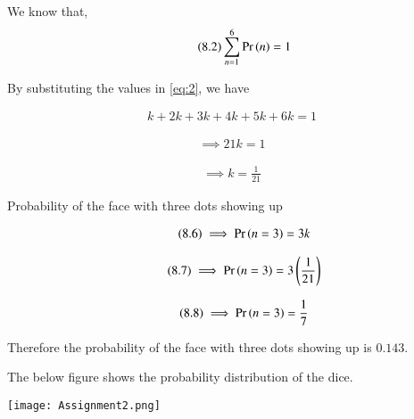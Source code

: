 \documentclass[journal,12pt,twocolumn]{IEEEtran}
\begin{document}
\vspace{\baselineskip}

We know that,
\begin{align}
    \tag{8.2}
    \sum_{n=1}^6\Pr\left(n\right)=1
    \label{eq:2}
\end{align}

By substituting the values in \ref{eq:2}, we have

\begin{align}
    \tag{8.3}
    k+2k+3k+4k+5k+6k=1
    \label{eq:3}
\end{align}

\begin{align}
     \tag{8.4}
   \implies  21k=1
    \label{eq:4}
\end{align}

\begin{align}
     \tag{8.5}
   \implies  k=\frac{1}{21}
    \label{eq:5}
\end{align}


Probability of the face with three dots showing up 

\begin{align}
    \tag{8.6}
    \implies \Pr\left(n=3\right)=3k
    \label{eq:6}
\end{align}


\begin{align}
    \tag{8.7}
    \implies \Pr\left(n=3\right)=3 \left(\frac{1}{21}\right)
    \label{eq:7}
\end{align}

\begin{align}
    \tag{8.8}
    \implies \Pr\left(n=3\right)=\frac{1}{7}
    \label{eq:8}
\end{align}

Therefore the probability of the face with three dots showing up is $0.143$.

\vspace{\baselineskip}


The below figure shows the probability distribution of the dice.

\vspace{\baselineskip}

\centering
\texttt{[image: Assignment2.png]}
\end{document}
